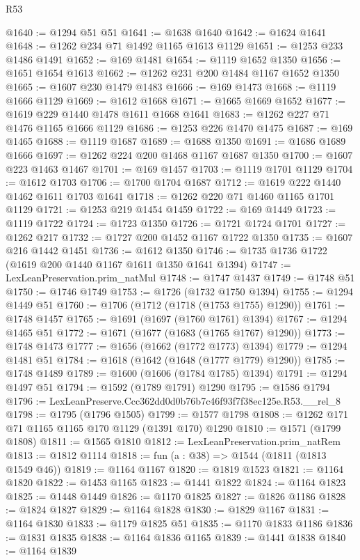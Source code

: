 \begin{lexlean}{R53}
\begin{coremodule}
@1640 := @1294 @51 @51
@1641 := @1638 @1640
@1642 := @1624 @1641
@1648 := @1262 @234 @71 @1492 @1165 @1613 @1129
@1651 := @1253 @233 @1486 @1491
@1652 := @169 @1481
@1654 := @1119 @1652 @1350
@1656 := @1651 @1654 @1613
@1662 := @1262 @231 @200 @1484 @1167 @1652 @1350
@1665 := @1607 @230 @1479 @1483
@1666 := @169 @1473
@1668 := @1119 @1666 @1129
@1669 := @1612 @1668
@1671 := @1665 @1669 @1652
@1677 := @1619 @229 @1440 @1478 @1611 @1668 @1641
@1683 := @1262 @227 @71 @1476 @1165 @1666 @1129
@1686 := @1253 @226 @1470 @1475
@1687 := @169 @1465
@1688 := @1119 @1687
@1689 := @1688 @1350
@1691 := @1686 @1689 @1666
@1697 := @1262 @224 @200 @1468 @1167 @1687 @1350
@1700 := @1607 @223 @1463 @1467
@1701 := @169 @1457
@1703 := @1119 @1701 @1129
@1704 := @1612 @1703
@1706 := @1700 @1704 @1687
@1712 := @1619 @222 @1440 @1462 @1611 @1703 @1641
@1718 := @1262 @220 @71 @1460 @1165 @1701 @1129
@1721 := @1253 @219 @1454 @1459
@1722 := @169 @1449
@1723 := @1119 @1722
@1724 := @1723 @1350
@1726 := @1721 @1724 @1701
@1727 := @1262 @217
@1732 := @1727 @200 @1452 @1167 @1722 @1350
@1735 := @1607 @216 @1442 @1451
@1736 := @1612 @1350
@1746 := @1735 @1736 @1722 (@1619 @200 @1440 @1167 @1611 @1350 @1641 @1394)
@1747 := LexLeanPreservation.prim_natMul
@1748 := @1747 @1437
@1749 := @1748 @51
@1750 := @1746 @1749
@1753 := @1726 (@1732 @1750 @1394)
@1755 := @1294 @1449 @51
@1760 := @1706 (@1712 (@1718 (@1753 @1755) @1290))
@1761 := @1748 @1457
@1765 := @1691 (@1697 (@1760 @1761) @1394)
@1767 := @1294 @1465 @51
@1772 := @1671 (@1677 (@1683 (@1765 @1767) @1290))
@1773 := @1748 @1473
@1777 := @1656 (@1662 (@1772 @1773) @1394)
@1779 := @1294 @1481 @51
@1784 := @1618 (@1642 (@1648 (@1777 @1779) @1290))
@1785 := @1748 @1489
@1789 := @1600 (@1606 (@1784 @1785) @1394)
@1791 := @1294 @1497 @51
@1794 := @1592 (@1789 @1791) @1290
@1795 := @1586 @1794
@1796 := LexLeanPreserve.Ccc362dd0d0b76b7c46f93f7f38ec125e.R53.__rel_8
@1798 := @1795 (@1796 @1505)
@1799 := @1577 @1798
@1808 := @1262 @171 @71 @1165 @1165 @170 @1129 (@1391 @170) @1290
@1810 := @1571 (@1799 @1808)
@1811 := @1565 @1810
@1812 := LexLeanPreservation.prim_natRem
@1813 := @1812 @1114
@1818 := fun (a : @38) => @1544 (@1811 (@1813 @1549 @46))
@1819 := @1164 @1167
@1820 := @1819 @1523
@1821 := @1164 @1820
@1822 := @1453 @1165
@1823 := @1441 @1822
@1824 := @1164 @1823
@1825 := @1448 @1449
@1826 := @1170 @1825
@1827 := @1826 @1186
@1828 := @1824 @1827
@1829 := @1164 @1828
@1830 := @1829 @1167
@1831 := @1164 @1830
@1833 := @1179 @1825 @51
@1835 := @1170 @1833 @1186
@1836 := @1831 @1835
@1838 := @1164 @1836 @1165
@1839 := @1441 @1838
@1840 := @1164 @1839

\end{coremodule}
\end{lexlean}
